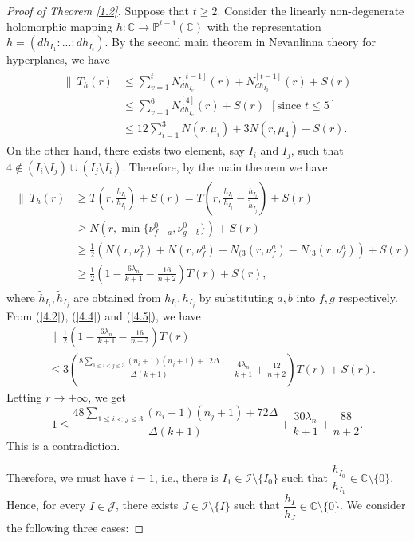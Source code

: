\documentclass[10pt,a4paper]{amsart}
\newcommand{\C}{{\mathbb{C}}}
\renewcommand{\P}{{\mathbb{P}}}
\begin{document}
\begin{proof}[Proof of Theorem \ref{1.2}]
Suppose that $t\ge 2$. Consider the linearly non-degenerate holomorphic mapping $h:\C \to \P^{t-1}(\C)$ with the representation $h=(d h_{I_1}:...:d h_{I_t})$. By the second main theorem in Nevanlinna theory for hyperplanes, we have
\begin{align}\label{4.4}
\begin{split}
\|\ T_h(r)&\le \sum_{v=1}^t N^{[t-1]}_{dh_{I_v}}(r)+N_{dh_{I_0}}^{[t-1]}(r)+S(r)\\
&\le \sum_{v=1}^6 N^{[4]}_{dh_{I_v}}(r)+S(r)\ \  [\text{since $t\le 5$}]\\
&\le 12\sum_{i=1}^3N(r,\mu_i)+3N(r,\mu_4)+S(r).
\end{split}
\end{align}
On the other hand, there exists two element, say $I_i$ and $I_j$, such that $4\not\in (I_i\setminus I_j)\cup (I_j\setminus I_i)$. Therefore, by the main theorem we have
\begin{align}\label{4.5}
\begin{split}
\|\ T_h(r)&\ge T(r,\frac{h_{I_i}}{h_{I_j}})+S(r)=T(r,\frac{h_{I_i}}{h_{I_j}}-\frac{\tilde h_{I_i}}{\tilde h_{I_j}})+S(r)\\
&\ge N(r,\min\{\nu^0_{f-a},\nu^0_{g-b}\})+S(r)\\
&\ge \frac{1}{2}\left(N(r,\nu^a_{f})+N(r,\nu^a_{f})-N_{(3}(r,\nu^a_{f})-N_{(3}(r,\nu^a_{f})\right)+S(r)\\
&\ge \frac{1}{2}\left(1-\frac{6\lambda_n}{k+1}-\frac{16}{n+2}\right)T(r)+S(r),
\end{split}
\end{align}
where $\tilde h_{I_i},\tilde h_{I_j}$ are obtained from $h_{I_i},h_{I_j}$ by substituting $a,b$ into $f,g$ respectively.
From (\ref{4.2}), (\ref{4.4}) and (\ref{4.5}), we have
\begin{align*}
&\biggl\|\  \frac{1}{2}\left(1-\frac{6\lambda_n}{k+1}-\frac{16}{n+2}\right)T(r)\\ 
& \le 3\left(\frac{8\sum_{1\le i<j\le 3}(n_i+1)(n_j+1)+12\Delta}{\Delta(k+1)}+\frac{4\lambda_n}{k+1}+\frac{12}{n+2}\right)T(r)+S(r).
\end{align*}
Letting $r\longrightarrow +\infty$, we get 
$$1\le \frac{48\sum_{1\le i<j\le 3}(n_i+1)(n_j+1)+72\Delta}{\Delta(k+1)}+\frac{30\lambda_n}{k+1}+\frac{88}{n+2}.$$
This is a contradiction.

Therefore, we must have $t=1$, i.e., there is $I_1\in \mathcal {I}\setminus \{I_0\}$ such that  $\dfrac {h_{I_0}}{h_{I_1}}\in\C\setminus\{0\}$. Hence, for every $I\in\mathcal J$, there exists $J\in\mathcal I\setminus\{I\}$ such that $\dfrac{h_I}{h_J}\in\C\setminus\{0\}$. We consider the following three cases:


\end{proof}
\end{document}

